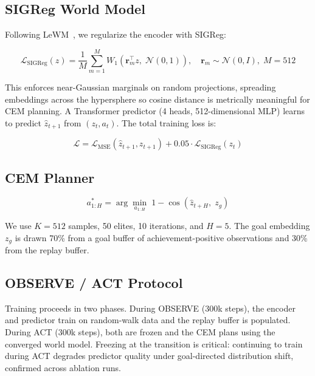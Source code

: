 \documentclass[12pt]{article}
\begin{document}
\subsection{SIGReg World Model}

Following LeWM~\cite{yarats2025lewm}, we regularize the encoder with SIGReg:

\begin{equation}
\mathcal{L}_{\text{SIGReg}}(z) = \frac{1}{M} \sum_{m=1}^{M} W_1\!\left(\mathbf{r}_m^\top z,\; \mathcal{N}(0,1)\right), \quad \mathbf{r}_m \sim \mathcal{N}(0,I),\; M=512
\end{equation}

This enforces near-Gaussian marginals on random projections, spreading embeddings across the hypersphere so cosine distance is metrically meaningful for CEM planning. A Transformer predictor (4 heads, 512-dimensional MLP) learns to predict $\hat{z}_{t+1}$ from $(z_t, a_t)$. The total training loss is:

\begin{equation}
\mathcal{L} = \mathcal{L}_{\text{MSE}}(\hat{z}_{t+1}, z_{t+1}) + 0.05 \cdot \mathcal{L}_{\text{SIGReg}}(z_t)
\end{equation}

\subsection{CEM Planner}

\begin{equation}
a_{1:H}^* = \arg\min_{a_{1:H}}\; 1 - \cos\!\left(\hat{z}_{t+H},\; z_g\right)
\end{equation}

We use $K=512$ samples, 50 elites, 10 iterations, and $H=5$. The goal embedding $z_g$ is drawn 70\% from a goal buffer of achievement-positive observations and 30\% from the replay buffer.

\subsection{OBSERVE / ACT Protocol}

Training proceeds in two phases. During OBSERVE (300k steps), the encoder and predictor train on random-walk data and the replay buffer is populated. During ACT (300k steps), both are frozen and the CEM plans using the converged world model. Freezing at the transition is critical: continuing to train during ACT degrades predictor quality under goal-directed distribution shift, confirmed across ablation runs.
\end{document}

